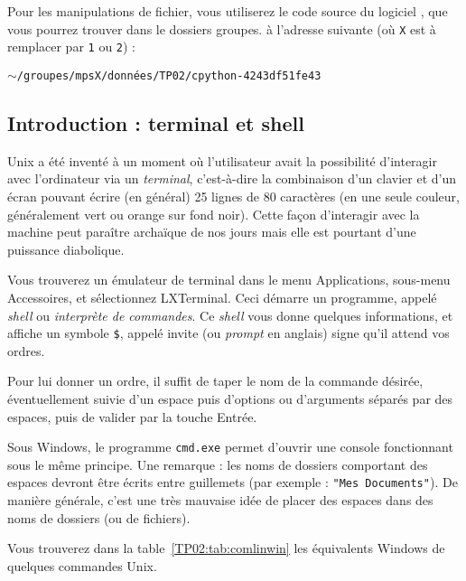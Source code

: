 Pour les manipulations de fichier, vous utiliserez le code source du logiciel
\python{}, que vous pourrez trouver dans le dossiers groupes. à l'adresse suivante (où \texttt{X} 
est à remplacer par \texttt{1} ou \texttt{2})  :
\begin{center}
  $\sim$\texttt{/groupes/mpsX/données/TP02/cpython-4243df51fe43}
\end{center}




\subsection{Introduction : terminal et shell} 

Unix a été inventé à un moment où l'utilisateur avait la possibilité
d'interagir avec l'ordinateur via un \emph{terminal}, c'est-à-dire la
combinaison d'un clavier et d'un écran pouvant écrire (en général) 25
lignes de 80 caractères (en une seule couleur, généralement vert ou
orange sur fond noir). Cette façon d'interagir avec la machine peut
paraître archaïque de nos jours mais elle est pourtant d'une puissance
diabolique.

Vous trouverez un émulateur de terminal dans
le menu \og{}Applications\fg{}, sous-menu \og{}Accessoires\fg{}, et
sélectionnez \og{}LXTerminal\fg{}. Ceci démarre un programme, appelé
\textit{shell}
ou \emph{interprète de commandes}. Ce \textit{shell} vous donne
quelques informations, et
affiche un symbole \texttt{\$}, appelé invite (ou \textit{prompt} en
anglais) signe qu'il attend vos ordres.

Pour lui donner un ordre, il suffit de taper le nom de la commande
désirée, éventuellement suivie d'un espace puis
d'options ou d'arguments séparés par des espaces, puis de valider par la touche
Entrée.

Sous Windows, le programme \texttt{cmd.exe} permet d'ouvrir une console fonctionnant sous le même principe.
Une remarque : les noms de dossiers comportant des espaces devront être écrits entre guillemets (par exemple : \texttt{"Mes Documents"}). 
De manière générale, c'est une très mauvaise idée de placer des espaces dans des noms de dossiers (ou de fichiers). 

Vous trouverez dans la table~\ref{TP02:tab:comlinwin} les équivalents Windows de quelques commandes Unix. 

